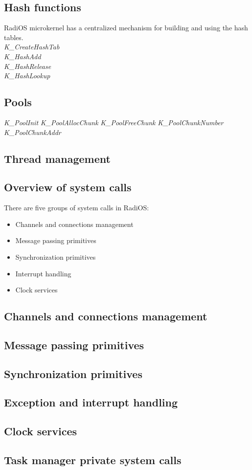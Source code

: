 \subsection{Hash functions}

RadiOS microkernel has a centralized mechanism for building and using the
hash tables.
\\
\textit{K\_CreateHashTab}
\\
\textit{K\_HashAdd}
\\
\textit{K\_HashRelease}
\\
\textit{K\_HashLookup}
\\

\subsection{Pools}

\textit{K\_PoolInit}
\textit{K\_PoolAllocChunk}
\textit{K\_PoolFreeChunk}
\textit{K\_PoolChunkNumber}
\textit{K\_PoolChunkAddr}

\subsection{Thread management}

\subsection{Overview of system calls}

There are five groups of system calls in RadiOS:

\begin{itemize}
\item{Channels and connections management}
\item{Message passing primitives}
\item{Synchronization primitives}
\item{Interrupt handling}
\item{Clock services}
\end{itemize}

\subsection{Channels and connections management}

\subsection{Message passing primitives}

\subsection{Synchronization primitives}

\subsection{Exception and interrupt handling}

\subsection{Clock services}

\subsection{Task manager private system calls}
